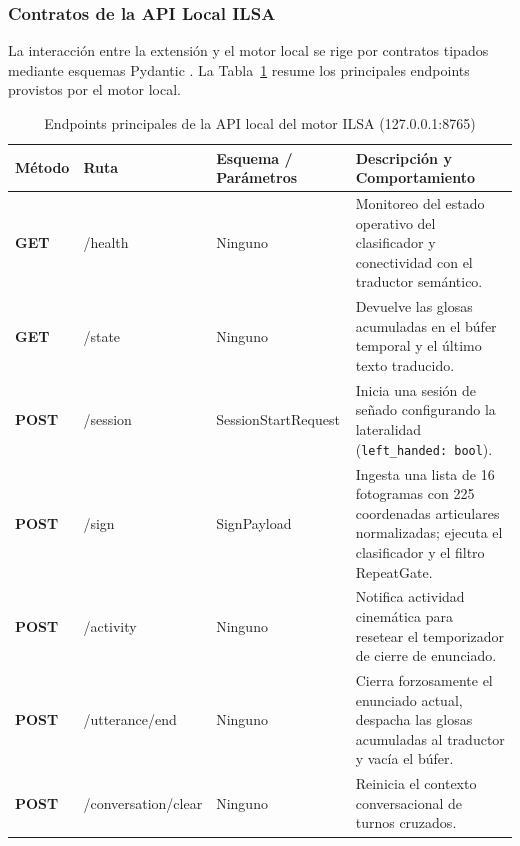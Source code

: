 \subsubsection{Contratos de la API Local ILSA}
La interacción entre la extensión y el motor local se rige por contratos tipados mediante esquemas Pydantic \parencite{tiangolo2018fastapi}. La Tabla~\ref{tab:endpoints_ilsa} resume los principales endpoints provistos por el motor local.
\begin{table}[H]
\centering
\small
\renewcommand{\arraystretch}{1.25}
\setlength{\tabcolsep}{4.5pt}
\caption{Endpoints principales de la API local del motor ILSA (127.0.0.1:8765)}
\label{tab:endpoints_ilsa}
\begin{tabularx}{\textwidth}{@{}>{\bfseries}l >{\ttfamily}l >{\raggedright\arraybackslash\hsize=0.55\hsize}X >{\raggedright\arraybackslash\hsize=1.45\hsize}X@{}}
\toprule
Método & \textrm{\textbf{Ruta}} & \textbf{Esquema / Parámetros} & \textbf{Descripción y Comportamiento} \\
\midrule
GET & /health & Ninguno & Monitoreo del estado operativo del clasificador y conectividad con el traductor semántico. \\
\addlinespace[3pt]
GET & /state & Ninguno & Devuelve las glosas acumuladas en el búfer temporal y el último texto traducido. \\
\addlinespace[3pt]
POST & /session & Session\-Start\-Request & Inicia una sesión de señado configurando la lateralidad (\texttt{left\_handed: bool}). \\
\addlinespace[3pt]
POST & /sign & SignPayload & Ingesta una lista de 16 fotogramas con 225 coordenadas articulares normalizadas; ejecuta el clasificador y el filtro RepeatGate. \\
\addlinespace[3pt]
POST & /activity & Ninguno & Notifica actividad cinemática para resetear el temporizador de cierre de enunciado. \\
\addlinespace[3pt]
POST & /utterance/end & Ninguno & Cierra forzosamente el enunciado actual, despacha las glosas acumuladas al traductor y vacía el búfer. \\
\addlinespace[3pt]
POST & /conversation/clear & Ninguno & Reinicia el contexto conversacional de turnos cruzados. \\
\bottomrule
\end{tabularx}
\end{table}

